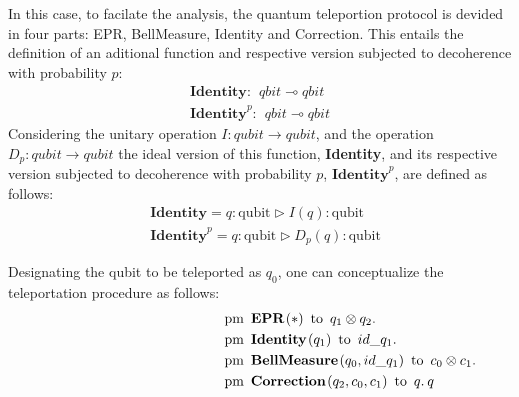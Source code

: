 In this case, to facilate the analysis, the quantum teleportion protocol is devided in four parts: EPR, BellMeasure, Identity and Correction. This entails the definition of an aditional function and respective version subjected to decoherence with probability $p$:
\begin{equation*}
  \begin{split}
  \textbf{Identity}: \hspace{5pt} \textit{qbit}  \multimap \textit{qbit} \\
  \textbf{Identity}^{p}: \hspace{5pt} \textit{qbit}  \multimap \textit{qbit}
  \end{split}
\end{equation*}
Considering the unitary operation $I: \textit{qubit} \xrightarrow{} \textit{qubit}$, and the operation $D_{p}: \textit{qubit} \xrightarrow{}  \textit{qubit}$  the ideal version of this function, \textbf{Identity}, and its respective version subjected to decoherence with probability $p$, $\textbf{Identity}^{p}$,  are defined as follows:
\begin{align}
  &\textbf{Identity} =  q: \text{qubit}  \triangleright  I (q) :  \text{qubit} \\
  &\textbf{Identity}^{p} =  q: \text{qubit}  \triangleright  D_{p} (q) : \text{qubit}
\end{align}

Designating the qubit to be teleported as $q_0$, one can conceptualize the teleportation procedure as follows:
\begin{align*}
    \hspace{130 pt}& \text{pm} \hspace{5pt} \textbf{EPR}\hspace{1pt} (*) \hspace{5pt} \text{to} \hspace{5pt}  q_{1} \otimes q_{2}.  \notag \\
    & \text{pm}\hspace{5pt} \textbf{Identity} \hspace{1pt} (q_{1}) \hspace{5pt}  \text{to} \hspace{5pt} id\_q_{1}. \notag \\
    & \text{pm}\hspace{5pt} \textbf{BellMeasure} \hspace{1pt} (q_0,id\_q_{1}) \hspace{5pt}  \text{to} \hspace{5pt} c_{0}\otimes c_{1} . \notag \\
    & \text{pm} \hspace{5pt}  \textbf{Correction} \hspace{1pt} ( q_{2},  c_{0}, c_{1} ) \hspace{5pt} \text{to} \hspace{5pt}  q. \hspace{2pt}  q
\end{align*}

